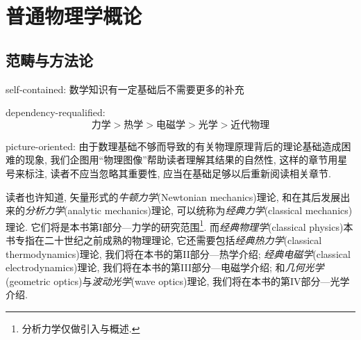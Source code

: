 \chapter{普通物理学概论}\label{1}


\section{范畴与方法论}\label{1-1}

self-contained: 数学知识有一定基础后不需要更多的补充

dependency-requalified: 
\[\text{力学}>\text{热学}>\text{电磁学}>\text{光学}>\text{近代物理}\]

picture-oriented: 由于数理基础不够而导致的有关物理原理背后的理论基础造成困难的现象, 我们企图用``物理图像''帮助读者理解其结果的自然性, 这样的章节用星号来标注, 读者不应当忽略其重要性, 应当在基础足够以后重新阅读相关章节.

读者也许知道, 矢量形式的\emph{牛顿力学}(Newtonian mechanics)理论, 和在其后发展出来的\emph{分析力学}(analytic mechanics)理论, 可以统称为\emph{经典力学}(classical mechanics)理论. 它们将是本书第I部分---力学的研究范围\footnote{分析力学仅做引入与概述.}. 而\emph{经典物理学}(classical physics)本书专指在二十世纪之前成熟的物理理论, 它还需要包括\emph{经典热力学}(classical thermodynamics)理论, 我们将在本书的第II部分---热学介绍; \emph{经典电磁学}(classical electrodynamics)理论, 我们将在本书的第III部分---电磁学介绍; 和\emph{几何光学}(geometric optics)与\emph{波动光学}(wave optics)理论, 我们将在本书的第IV部分---光学介绍.